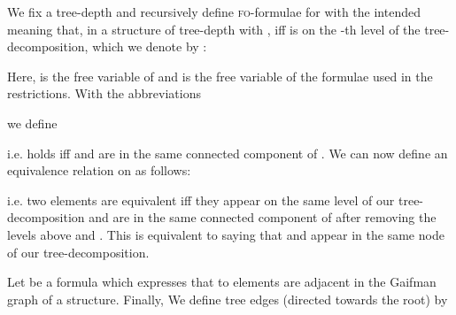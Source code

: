 \documentclass[11pt]{article}
\newcommand{\logic}[1]{\textsc{#1}}
\newcommand{\FO}{\logic{fo}}
\begin{document}
We fix a tree-depth  and recursively define \FO-formulae
 for  with the intended meaning that,
in a structure  of tree-depth  with ,
 iff  is on the -th level of the
tree-decomposition, which we denote by : 

Here,  is the free variable of  and  is the free
variable of the formulae used in the restrictions. With the
abbreviations

we define

i.e.  holds iff  and  are in the same connected
component of . We can now define an
equivalence relation on  as follows:

i.e. two elements are equivalent iff they appear on the same level of
our tree-decomposition and are in the same connected component of 
after removing the levels above  and . This is equivalent to
saying that  and  appear in the same node of our
tree-decomposition.

Let  be a formula which expresses
that to elements are adjacent in the Gaifman graph of a structure.
Finally, We define tree edges (directed towards the root) by
\end{document}
